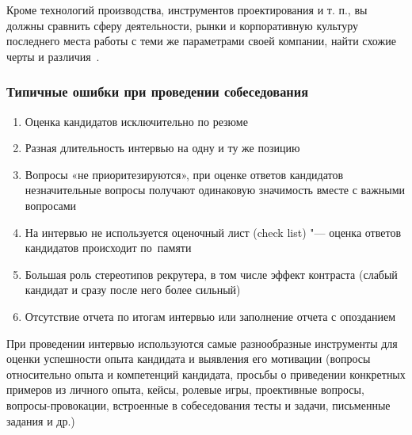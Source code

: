 \documentclass{../industrial-development}
\begin{document}
Кроме технологий производства, инструментов проектирования и т. п., вы должны сравнить сферу деятельности, рынки и корпоративную культуру последнего места работы с теми же параметрами своей компании, найти схожие черты и различия~\cite[с.~285]{Pererva}.

\begin{frame} \frametitle{Типичные ошибки при проведении собеседования}

  \begin{enumerate}	
	\item Оценка кандидатов исключительно по резюме
	\item Разная длительность интервью на одну и ту же позицию
	\item Вопросы «не приоритезируются», при оценке ответов кандидатов незначительные вопросы получают одинаковую значимость  вместе с важными вопросами
	\item На интервью не используется оценочный лист (check list) "--- оценка ответов кандидатов происходит по~памяти
	\item Большая роль стереотипов рекрутера, в том числе эффект контраста (слабый кандидат и сразу после него более сильный)
 \item Отсутствие отчета по итогам интервью или заполнение отчета с опозданием

 \end{enumerate}
\end{frame}

\lecturenotes

При проведении интервью используются самые разнообразные инструменты для оценки успешности опыта кандидата и выявления его мотивации (вопросы относительно опыта и компетенций кандидата, просьбы о приведении конкретных примеров из личного опыта, кейсы, ролевые игры, проективные вопросы, вопросы-провокации, встроенные в собеседования тесты и задачи, письменные задания и др.)
\end{document}
